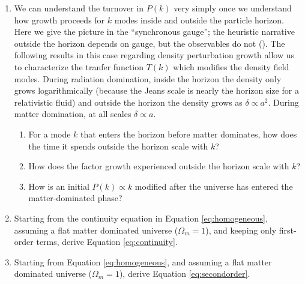 \begin{enumerate}
\item We can understand the turnover in $P(k)$ very simply once we
understand how growth proceeds for $k$ modes inside and outside the
particle horizon. Here we give the picture in the ``synchronous
gauge''; the heuristic narrative outside the horizon depends on gauge,
but the observables do not (\citealt{ma95a}). The following results in
this case regarding density perturbation growth allow us to
characterize the tranfer function $T(k)$ which modifies the density
field modes.  During radiation domination, inside the horizon the
density only grows logarithmically (because the Jeans scale is nearly
the horizon size for a relativistic fluid) and outside the horizon the
density grows as $\delta\propto a^2$. During matter domination, at all
scales $\delta\propto a$.
\begin{enumerate}
\item For a mode $k$ that enters the horizon before matter dominates,
how does the time it spends outside the horizon scale with $k$? 
\item How does the factor growth experienced outside the horizon scale
with $k$?
\item How is an initial $P(k) \propto k$ modified after the universe
has entered the matter-dominated phase?
\end{enumerate}
\item Starting from the continuity equation in Equation
   \ref{eq:homogeneous}, assuming a flat matter dominated universe
    ($\Omega_m = 1$), and keeping only first-order terms, derive
    Equation \ref{eq:continuity}.

%


\item Starting from Equation \ref{eq:homogeneous}, and assuming a flat
    matter dominated universe ($\Omega_m = 1$), derive
    Equation \ref{eq:secondorder}.


\end{enumerate}
